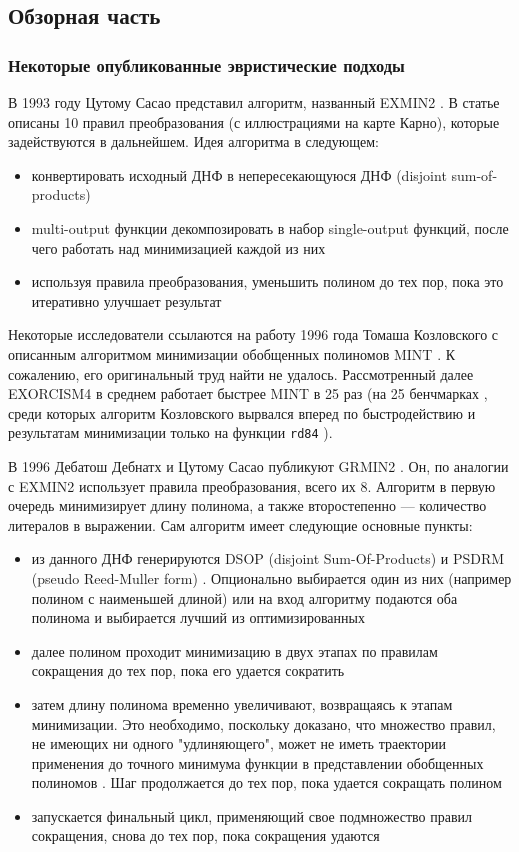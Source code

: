 \documentclass[a4paper,12pt,titlepage,finall]{article}
\begin{document}
\subsection{Обзорная часть}

\subsubsection{Некоторые опубликованные эвристические подходы}

В 1993 году Цутому Сасао представил алгоритм, названный \textsc{EXMIN2} \cite{exmin2}.
В статье описаны 10 правил преобразования (с иллюстрациями на карте Карно), которые задействуются в дальнейшем. Идея алгоритма в следующем:
\begin{itemize}
    \item конвертировать исходный ДНФ в непересекающуюся ДНФ (disjoint sum-of-products)
    \item multi-output функции декомпозировать в набор single-output функций, после чего работать над минимизацией каждой из них
    \item используя правила преобразования, уменьшить полином до тех пор, пока это итеративно улучшает результат
\end{itemize}

Некоторые исследователи ссылаются на работу 1996 года Томаша Козловского с описанным алгоритмом минимизации обобщенных полиномов \textsc{MINT} \cite{mint}. К сожалению, его оригинальный труд найти не удалось. Рассмотренный далее \textsc{EXORCISM4} в среднем работает быстрее \textsc{MINT} в 25 раз (на 25 бенчмарках \cite{exorcism4}, среди которых алгоритм Козловского вырвался вперед по быстродействию и результатам минимизации только на функции \texttt{rd84} \cite{benchmark}).

В 1996 Дебатош Дебнатх и Цутому Сасао публикуют GRMIN2 \cite{grmin2}.
Он, по аналогии с \textsc{EXMIN2} использует правила преобразования, всего их 8. Алгоритм в первую очередь минимизирует длину полинома, а также второстепенно --- количество литералов в выражении. Сам алгоритм имеет следующие основные пункты:
\begin{itemize}
    \item из данного ДНФ генерируются DSOP (disjoint Sum-Of-Products) \cite{exmin2} и PSDRM (pseudo Reed-Muller form) \cite{psdrm}. Опционально выбирается один из них (например полином с наименьшей длиной) или на вход алгоритму подаются оба полинома и выбирается лучший из оптимизированных
    \item далее полином проходит минимизацию в двух этапах по правилам сокращения до тех пор, пока его удается сократить
    \item затем длину полинома временно увеличивают, возвращаясь к этапам минимизации. Это необходимо, поскольку доказано, что множество правил, не имеющих ни одного "удлиняющего", может не иметь траектории применения до точного минимума функции в представлении обобщенных полиномов \cite{convergence}. Шаг продолжается до тех пор, пока удается сокращать полином
    \item запускается финальный цикл, применяющий свое подмножество правил сокращения, снова до тех пор, пока сокращения удаются
\end{itemize}
\end{document}
